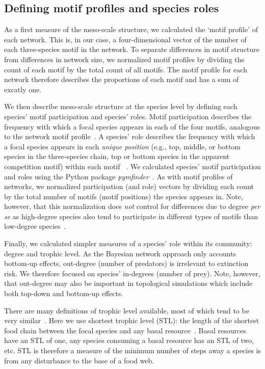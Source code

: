 \documentclass[12pt]{article}
\begin{document}
\begin{spacing}{2.0}
	\subsection*{Defining motif profiles and species roles}

        As a first measure of the meso-scale structure, we calculated the `motif profile' of each network.
        This is, in our case, a four-dimensional vector of the number of each three-species motif in the network.
        To separate differences in motif structure from differences in network size, we normalized motif profiles by dividing the count of each motif by the total count of all motifs.
        The motif profile for each network therefore describes the proportions of each motif and has a sum of excatly one.

    
        We then describe meso-scale structure at the species level by defining each species' motif participation and species' roles.
        Motif participation describes the frequency with which a focal species appears in each of the four motifs, analogous to the network motif profile~\citep{Stouffer2012}.
        A species' role describes the frequency with which a focal species appears in each \emph{unique position} (e.g., top, middle, or bottom species in the three-species chain, top or bottom species in the apparent competition motif) within each motif ~\citep{Stouffer2012,Cirtwill2017}.
		We calculated species' motif participation and roles using the Python package \emph{pymfinder}~\citep{pymfinder}.
        As with motif profiles of networks, we normalized participation (and role) vectors by dividing each count by the total number of motifs (motif positions) the species appears in.
        Note, however, that this normalization does \emph{not} control for differences due to degree \emph{per se} as high-degree species also tend to participate in different types of motifs than low-degree species~\citep{Cirtwill2021_inprep}.
        
        
        Finally, we calculated simpler measures of a species' role within its community: degree and trophic level.
		As the Bayesian network approach only accounts  bottom-up effects, out-degree (number of predators) is irrelevant to extinction risk.
		We therefore focused on species' in-degrees (number of prey).
		Note, however, that out-degree may also be important in topological simulations which include both top-down and bottom-up effects. 


		There are many definitions of trophic level available, most of which tend to be very similar~\citep{Carscallen2012}.
		Here we use shortest trophic level (STL): the length of the shortest food chain between the focal species and any basal resource~\citep{Williams2004}. 
		Basal resources have an STL of one, any species consuming a basal resource has an STL of two, etc.
        STL is therefore a measure of the minimum number of steps away a species is from any disturbance to the base of a food web.



\end{spacing}
\end{document}

